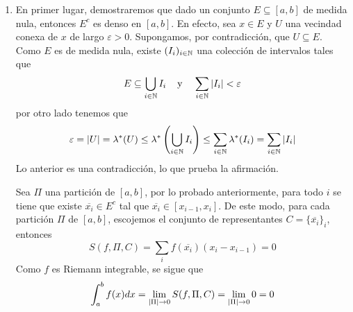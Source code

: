 \documentclass{article}
\begin{document}
\begin{enumerate}
    \item En primer lugar, demostraremos que dado un conjunto $E\subseteq[a,b]$ de medida nula, 
    entonces $E^{c}$ es denso en $[a,b]$. En efecto, sea $x\in E$ y $U$ una vecindad conexa de $x$ 
    de largo $\varepsilon>0$. Supongamos, por contradicción, que $U\subseteq E$. 
    Como $E$ es de medida nula, existe $(I_{i})_{i\in\mathbb{N}}$ una colección de intervalos tales que
    \begin{equation*}
        E\subseteq\bigcup_{i\in\mathbb{N}}I_{i}\hspace{4mm}\text{y}\hspace{4mm}
        \sum_{i\in\mathbb{N}}\left|I_{i} \right|<\varepsilon
    \end{equation*}
    por otro lado tenemos que
    \begin{equation*}
        \varepsilon=\left|U \right|=\lambda^{*}(U)\leq\lambda^{*}\left(\bigcup_{i\in\mathbb{N}}I_{i}\right)\leq
        \sum_{i\in\mathbb{N}}\lambda^{*}(I_{i})=\sum_{i\in\mathbb{N}}\left|I_{i} \right|
    \end{equation*}
    Lo anterior es una contradicción, lo que prueba la afirmación.
    \vspace{4mm}

    \noindent Sea $\Pi$ una partición de $[a,b]$, por lo probado anteriormente, para todo $i$ se
    tiene que existe $\overline{x_{i}}\in E^{c}$ tal que $\overline{x_{i}}\in[x_{i-1},x_{i}]$. De
    este modo, para cada partición $\Pi$ de $[a,b]$, escojemos el conjunto de representantes 
    $C=\{\overline{x_{i}}\}_{i}$, entonces
    \begin{equation*}
        S(f,\Pi,C)=\sum_{i}f(\overline{x_{i}})(x_{i}-x_{i-1})=0
    \end{equation*}
    Como $f$ es Riemann integrable, se sigue que
    \begin{equation*}
        \int_{a}^{b}f(x)dx=\lim_{\left|\Pi \right|\to0}S(f,\Pi,C)=\lim_{\left|\Pi \right|\to0}0=0
    \end{equation*}
\end{enumerate}
\end{document}
